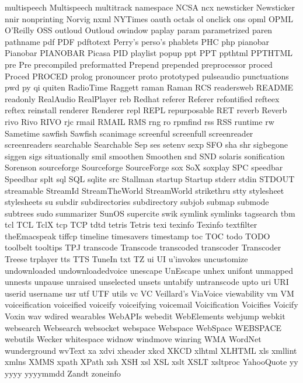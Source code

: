 multispeech
Multispeech
multitrack
namespace
NCSA
ncx
newsticker
Newsticker
nnir
nonprinting
Norvig
nxml
NYTimes
oauth
octals
ol
onclick
ons
opml
OPML
O'Reilly
OSS
outloud
Outloud
owindow
paplay
param
parametrized
paren
pathname
pdf
PDF
pdftotext
Perry's
perso's
phablets
PHC
php
pianobar
Pianobar
PIANOBAR
Picasa
PID
playlist
popup
ppt
PPT
ppthtml
PPTHTML
pre
Pre
precompiled
preformatted
Prepend
prepended
preprocessor
proced
Proced
PROCED
prolog
pronouncer
proto
prototyped
pulseaudio
punctuations
pwd
py
qi
quiten
RadioTime
Raggett
raman
Raman
RCS
readersweb
README
readonly
RealAudio
RealPlayer
reb
Redhat
referer
Referer
refontified
refteex
reftex
reinstall
renderer
Renderer
repl
REPL
repurposable
RET
reverb
Reverb
rivo
Rivo
RIVO
rjc
rmail
RMAIL
RMS
rng
ro
rpmfind
rss
RSS
runtime
rw
Sametime
sawfish
Sawfish
scanimage
screenful
screenfull
screenreader
screenreaders
searchable
Searchable
Sep
ses
setenv
sexp
SFO
sha
shr
sigbegone
siggen
sigs
situationally
smil
smoothen
Smoothen
snd
SND
solaris
sonification
Sorenson
sourceforge
Sourceforge
SourceForge
sox
SoX
soxplay
SPC
speedbar
Speedbar
splt
sql
SQL
sqlite
src
Stallman
startup
Startup
stderr
stdin
STDOUT
streamable
StreamId
StreamTheWorld
StreamWorld
strikethru
stty
stylesheet
stylesheets
su
subdir
subdirectories
subdirectory
subjob
submap
submode
subtrees
sudo
summarizer
SunOS
supercite
swik
symlink
symlinks
tagsearch
tbm
tcl
TCL
TclX
tcp
TCP
tdtd
tetris
Tetris
texi
texinfo
Texinfo
textfilter
theEmacspeak
tiffcp
timeline
timesavers
timestamp
toc
TOC
todo
TODO
toolbelt
tooltips
TPJ
transcode
Transcode
transcoded
transcoder
Transcoder
Treese
trplayer
tts
TTS
TuneIn
txt
TZ
ui
UI
u'invokes
uncustomize
undownloaded
undownloadedvoice
unescape
UnEscape
unhex
unifont
unmapped
unnests
unpause
unraised
unselected
unsets
untabify
untranscode
upto
uri
URI
userid
username
usr
utf
UTF
utils
vc
VC
Veillard's
ViaVoice
viewability
vm
VM
voiceification
voiceified
voiceify
voiceifying
voicemail
Voicification
Voicifies
Voicify
Voxin
wav
wdired
wearables
WebAPIs
webedit
WebElements
webjump
webkit
websearch
Websearch
websocket
webspace
Webspace
WebSpace
WEBSPACE
webutils
Wecker
whitespace
widnow
windmove
winring
WMA
WordNet
wunderground
wvText
xa
xdvi
xheader
xkcd
XKCD
xlhtml
XLHTML
xls
xmllint
xmlns
XMMS
xpath
XPath
xsh
XSH
xsl
XSL
xslt
XSLT
xsltproc
YahooQuote
yy
yyyy
yyyymmdd
Zandt
zoneinfo

